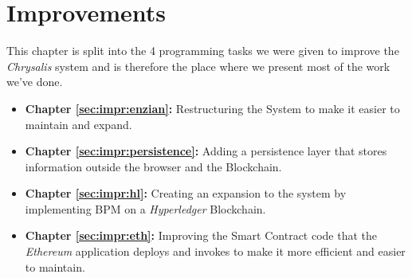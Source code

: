 %
\chapter{Improvements}
\label{sec:impr}

This chapter is split into the 4 programming tasks we were given to improve the \emph{Chrysalis} system and is therefore the place where we present most of the work we've done.
\begin{itemize}
    \item \textbf{Chapter \ref{sec:impr:enzian}:} Restructuring the System to make it easier to maintain and expand.
    \item \textbf{Chapter \ref{sec:impr:persistence}:} Adding a persistence layer that stores information outside the browser and the Blockchain.
    \item \textbf{Chapter \ref{sec:impr:hl}:} Creating an expansion to the system by implementing BPM on a \emph{Hyperledger} Blockchain.
    \item \textbf{Chapter \ref{sec:impr:eth}:} Improving the Smart Contract code that the \emph{Ethereum} application deploys and invokes to make it more efficient and easier to maintain.
\end{itemize}
